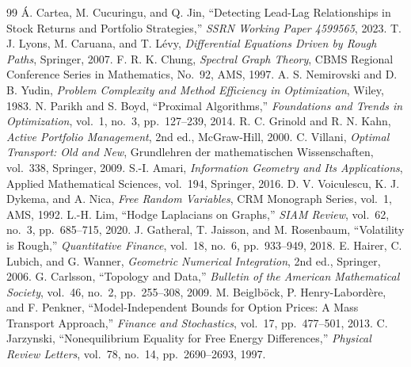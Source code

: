 \documentclass[10pt,a4paper]{article}
\begin{document}
\begin{thebibliography}{99}
 \'{A}. Cartea, M. Cucuringu, and Q. Jin, ``Detecting Lead-Lag Relationships in Stock Returns and Portfolio Strategies,'' \emph{SSRN Working Paper 4599565}, 2023.
 T. J. Lyons, M. Caruana, and T. L\'{e}vy, \emph{Differential Equations Driven by Rough Paths}, Springer, 2007.
 F. R. K. Chung, \emph{Spectral Graph Theory}, CBMS Regional Conference Series in Mathematics, No.\ 92, AMS, 1997.
 A. S. Nemirovski and D. B. Yudin, \emph{Problem Complexity and Method Efficiency in Optimization}, Wiley, 1983.
 N. Parikh and S. Boyd, ``Proximal Algorithms,'' \emph{Foundations and Trends in Optimization}, vol.\ 1, no.\ 3, pp.\ 127--239, 2014.
 R. C. Grinold and R. N. Kahn, \emph{Active Portfolio Management}, 2nd ed., McGraw-Hill, 2000.
 C. Villani, \emph{Optimal Transport: Old and New}, Grundlehren der mathematischen Wissenschaften, vol.\ 338, Springer, 2009.
 S.-I. Amari, \emph{Information Geometry and Its Applications}, Applied Mathematical Sciences, vol.\ 194, Springer, 2016.
 D. V. Voiculescu, K. J. Dykema, and A. Nica, \emph{Free Random Variables}, CRM Monograph Series, vol.\ 1, AMS, 1992.
 L.-H. Lim, ``Hodge Laplacians on Graphs,'' \emph{SIAM Review}, vol.\ 62, no.\ 3, pp.\ 685--715, 2020.
 J. Gatheral, T. Jaisson, and M. Rosenbaum, ``Volatility is Rough,'' \emph{Quantitative Finance}, vol.\ 18, no.\ 6, pp.\ 933--949, 2018.
 E. Hairer, C. Lubich, and G. Wanner, \emph{Geometric Numerical Integration}, 2nd ed., Springer, 2006.
 G. Carlsson, ``Topology and Data,'' \emph{Bulletin of the American Mathematical Society}, vol.\ 46, no.\ 2, pp.\ 255--308, 2009.
 M. Beiglb\"{o}ck, P. Henry-Labord\`{e}re, and F. Penkner, ``Model-Independent Bounds for Option Prices: A Mass Transport Approach,'' \emph{Finance and Stochastics}, vol.\ 17, pp.\ 477--501, 2013.
 C. Jarzynski, ``Nonequilibrium Equality for Free Energy Differences,'' \emph{Physical Review Letters}, vol.\ 78, no.\ 14, pp.\ 2690--2693, 1997.
\end{thebibliography}
\end{document}
